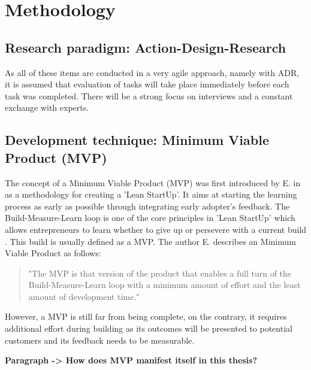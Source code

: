 \chapter{Methodology}
\section{Research paradigm: Action-Design-Research} 
As all of these items are conducted in a very agile approach, namely with \gls{ADR}, it is assumed that evaluation of tasks will take place immediately before each task was completed. There will be a strong focus on interviews and a constant exchange with experts. 


\section{Development technique: Minimum Viable Product (MVP)}
The concept of a Minimum Viable Product (MVP) was first introduced by \citeauthor{Ries:2011:TheLeanStartUp} E. in \citeyear{Ries:2011:TheLeanStartUp} as a methodology for creating a 'Lean StartUp'. It aims at starting the learning process as early as possible through integrating early adopter's feedback.\cite{Lenarduzzi:2016:MVP}
\newline\newline
The Build-Measure-Learn loop is one of the core principles in 'Lean StartUp' which allows entrepreneurs to learn whether to give up or persevere with a current build \cite{Lenarduzzi:2016:MVP}. This build is usually defined as a MVP. The author \citeauthor{Ries:2011:TheLeanStartUp} E. describes an Minimum Viable Product as follows:
\begin{quote}
    "The MVP is that version of the product that enables a full turn of the Build-Measure-Learn loop with a minimum amount of effort and the least amount of development time."\cite{Ries:2011:TheLeanStartUp}
\end{quote}
However, a MVP is still far from being complete, on the contrary, it requires additional effort during building as its outcomes will be presented to potential customers and its feedback needs to be measurable. \cite{Ries:2011:TheLeanStartUp}
\newline\newline

\textbf{Paragraph -> How does MVP manifest itself in this thesis?}

